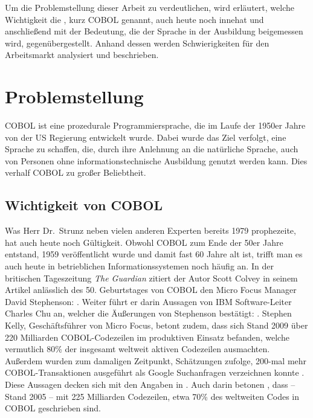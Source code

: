 Um die Problemstellung dieser Arbeit zu verdeutlichen, wird erläutert, welche Wichtigkeit die , kurz COBOL genannt, auch heute noch innehat und anschließend mit der Bedeutung, die der Sprache in der Ausbildung beigemessen wird, gegenübergestellt. Anhand dessen werden Schwierigkeiten für den Arbeitsmarkt analysiert und beschrieben.

\section{Problemstellung}\label{problemstellung}
 COBOL ist eine prozedurale Programmiersprache, die im Laufe der 1950er Jahre von der US Regierung entwickelt wurde. Dabei wurde das Ziel verfolgt, eine Sprache zu schaffen, die, durch ihre Anlehnung an die natürliche Sprache, auch von Personen ohne informationstechnische Ausbildung genutzt werden kann. Dies verhalf COBOL zu großer Beliebtheit.

\subsection*{Wichtigkeit von COBOL}\label{wichtigkeit}
 \cite{_ist_1979}

Was Herr Dr.\  Strunz neben vielen anderen Experten bereits 1979 prophezeite, hat auch heute noch Gültigkeit. Obwohl COBOL zum Ende der 50er Jahre entstand, 1959 veröffentlicht wurde und damit fast 60 Jahre alt ist, trifft man es auch heute in betrieblichen Informationssystemen noch häufig an. In der britischen Tageszeitung \textit{The Guardian} zitiert der Autor Scott Colvey in seinem Artikel \cite{colvey_cobol_2009} anlässlich des 50. Geburtstages von COBOL den Micro Focus Manager David Stephenson: . Weiter führt er darin Aussagen von IBM Software-Leiter Charles Chu an, welcher die Äußerungen von Stephenson bestätigt: . Stephen Kelly, Geschäftsführer von Micro Focus, betont zudem, dass sich Stand 2009 über 220 Milliarden COBOL-Codezeilen im produktiven Einsatz befanden, welche vermutlich 80\% der insgesamt weltweit aktiven Codezeilen ausmachten. Außerdem wurden zum damaligen Zeitpunkt, Schätzungen zufolge, 200-mal mehr COBOL-Transaktionen ausgeführt als Google Suchanfragen verzeichnen konnte \cite{kelly_cobol_2009}. Diese Aussagen decken sich mit den Angaben in . Auch darin betonen \citeauthor{doke_cobol_2005}, dass -- Stand 2005 -- mit 225 Milliarden Codezeilen, etwa 70\% des weltweiten Codes in COBOL geschrieben sind.


